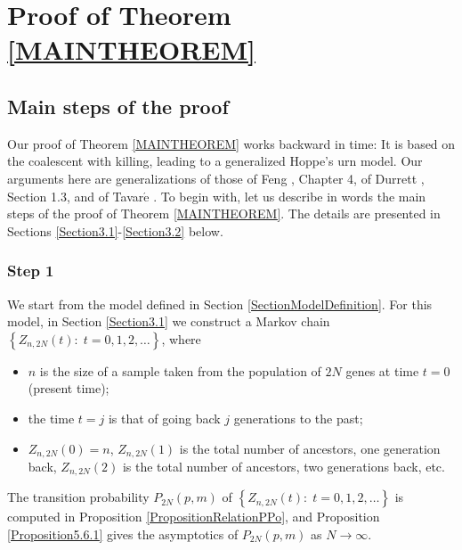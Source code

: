 \documentclass[12pt]{amsart}
\theoremstyle{definition}
\numberwithin{equation}{section}
\begin{document}
\section{Proof of Theorem \ref{MAINTHEOREM}}\label{SectionProof}
\subsection{Main steps of the proof}
Our proof of Theorem \ref{MAINTHEOREM} works backward in time: It is based on the coalescent with killing, leading to a generalized Hoppe's urn model.  Our arguments here are generalizations of those of Feng \cite{Feng},
Chapter 4, of Durrett \cite{Durrett}, Section 1.3, and of Tavar$\acute{\mbox{e}}$ \cite{TavareBook}.
To begin with, let us describe in words the main steps of the proof of Theorem \ref{MAINTHEOREM}. The details are presented in Sections
\ref{Section3.1}-\ref{Section3.2} below.
\subsubsection{Step 1} We start from the model defined in Section
\ref{SectionModelDefinition}. For this model,
in Section \ref{Section3.1} we construct a Markov chain
$\left\{Z_{n,2N}(t):\; t=0,1,2,\ldots\right\}$,  where
\begin{itemize}
  \item $n$ is the size of a sample taken from the population of $2N$
  genes at time $t=0$ (present time);
  \item the time $t=j$ is that of going back $j$ generations to the past;
  \item $Z_{n,2N}(0)=n$, $Z_{n,2N}(1)$ is the total  number of ancestors,
  one generation back, $Z_{n,2N}(2)$ is the total number of ancestors, two generations back, etc.
\end{itemize}
The transition probability $P_{2N}(p,m)$ of $\left\{Z_{n,2N}(t):\; t=0,1,2,\ldots\right\}$
is computed in Proposition
\ref{PropositionRelationPPo}, and Proposition \ref{Proposition5.6.1}
gives the asymptotics of $P_{2N}(p,m)$ as $N\longrightarrow\infty$.
\end{document}
